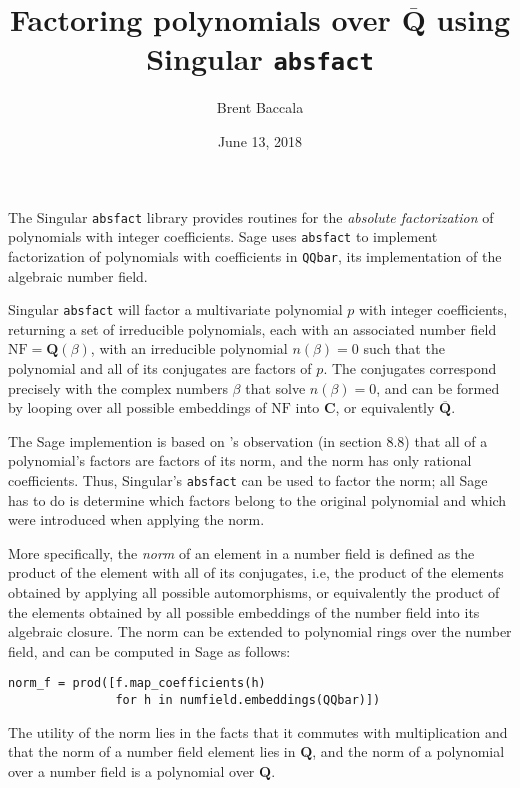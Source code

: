 \documentclass{article}
\newcommand{\Bold}[1]{\mathbf{#1}}
\newcommand{\CC}{\Bold{C}}
\newcommand{\QQ}{\Bold{Q}}
\newcommand{\QQbar}{\overline{\QQ}}
\begin{document}
\title{Factoring polynomials over $\QQbar$ using Singular {\tt absfact}}
\author{Brent Baccala}
\date{June 13, 2018}
\maketitle


The Singular {\tt absfact} library provides routines for the {\it
  absolute factorization} of polynomials with integer coefficients.
Sage uses {\tt absfact} to implement factorization of polynomials with
coefficients in {\tt QQbar}, its implementation of the algebraic
number field.

Singular {\tt absfact} will factor a multivariate polynomial $p$ with
integer coefficients, returning a set
of irreducible polynomials, each with an associated number field
$\mathrm{NF} = \QQ(\beta)$, with an irreducible polynomial $n(\beta)=0$
such that the polynomial and all of its conjugates are factors of
$p$.  The conjugates correspond precisely with the complex
numbers $\beta$ that solve $n(\beta)=0$, and can be formed by looping
over all possible embeddings of $\mathrm{NF}$ into $\CC$, or
equivalently $\QQbar$.

The Sage implemention is based on \cite{geddes}'s observation (in
section 8.8) that all of a polynomial's factors are factors of its
norm, and the norm has only rational coefficients.  Thus, Singular's
{\tt absfact} can be used to factor the norm; all Sage has to do is
determine which factors belong to the original polynomial and which
were introduced when applying the norm.

More specifically, the {\it norm} of an element in a number field is
defined as the product of the element with all of its conjugates, i.e,
the product of the elements obtained by applying all possible
automorphisms, or equivalently the product of the elements obtained
by all possible embeddings of the number field into its algebraic
closure.  The norm can be extended to polynomial rings over the
number field, and can be computed in Sage as follows:

\begin{verbatim}
norm_f = prod([f.map_coefficients(h)
               for h in numfield.embeddings(QQbar)])
\end{verbatim}

The utility of the norm lies in the facts that it commutes with
multiplication and that the norm of a number field element lies
in $\QQ$, and the norm of a polynomial over a number field is
a polynomial over $\QQ$.
\end{document}
